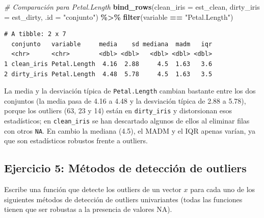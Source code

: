 \documentclass[
]{article}
\newenvironment{Shaded}{\begin{snugshade}}{\end{snugshade}}
\newcommand{\AttributeTok}[1]{\textcolor[rgb]{0.13,0.29,0.53}{#1}}
\newcommand{\CommentTok}[1]{\textcolor[rgb]{0.56,0.35,0.01}{\textit{#1}}}
\newcommand{\FunctionTok}[1]{\textcolor[rgb]{0.13,0.29,0.53}{\textbf{#1}}}
\newcommand{\NormalTok}[1]{#1}
\newcommand{\SpecialCharTok}[1]{\textcolor[rgb]{0.81,0.36,0.00}{\textbf{#1}}}
\newcommand{\StringTok}[1]{\textcolor[rgb]{0.31,0.60,0.02}{#1}}
\begin{document}
\begin{Shaded}
\begin{Highlighting}[]
\CommentTok{\# Comparación para Petal.Length}
\FunctionTok{bind\_rows}\NormalTok{(}\AttributeTok{clean\_iris =}\NormalTok{ est\_clean, }\AttributeTok{dirty\_iris =}\NormalTok{ est\_dirty, }\AttributeTok{.id =} \StringTok{"conjunto"}\NormalTok{) }\SpecialCharTok{\%\textgreater{}\%}
  \FunctionTok{filter}\NormalTok{(variable }\SpecialCharTok{==} \StringTok{"Petal.Length"}\NormalTok{)}
\end{Highlighting}
\end{Shaded}

\begin{verbatim}
# A tibble: 2 x 7
  conjunto   variable     media    sd mediana  madm   iqr
  <chr>      <chr>        <dbl> <dbl>   <dbl> <dbl> <dbl>
1 clean_iris Petal.Length  4.16  2.88     4.5  1.63   3.6
2 dirty_iris Petal.Length  4.48  5.78     4.5  1.63   3.5
\end{verbatim}

La media y la desviación típica de \texttt{Petal.Length} cambian
bastante entre los dos conjuntos (la media pasa de 4.16 a 4.48 y la
desviación típica de 2.88 a 5.78), porque los outliers (63, 23 y 14)
están en \texttt{dirty\_iris} y distorsionan esos estadísticos; en
\texttt{clean\_iris} se han descartado algunos de ellos al eliminar
filas con otros \texttt{NA}. En cambio la mediana (4.5), el MADM y el
IQR apenas varían, ya que son estadísticos robustos frente a outliers.

\subsection{Ejercicio 5: Métodos de detección de
outliers}\label{ejercicio-5-muxe9todos-de-detecciuxf3n-de-outliers}

Escribe una función que detecte los outliers de un vector \(x\) para
cada uno de los siguientes métodos de detección de outliers univariantes
(todas las funciones tienen que ser robustas a la presencia de valores
NA).
\end{document}
